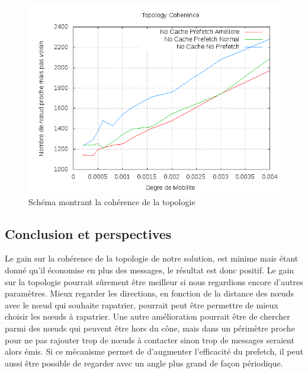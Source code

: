 	\begin{figure}[!h]
        \centering
        \includegraphics[scale=0.5]{../CacheCode/SolipsisPeersim/resultats/Courbes/Courbes_Final_Rapport/Topology_Coherence_Prefetchs.png}
	\caption{Schéma montrant la cohérence de la topologie}
	\label{courbeTopoPrefetch}
        \end{figure}



\subsection{Conclusion et perspectives}
Le gain sur la cohérence de la topologie de notre solution, est minime mais étant donné qu'il économise en plus des messages, le résultat est donc positif. Le gain sur la topologie pourrait sûrement être meilleur si nous regardions encore d'autres paramètres. Mieux regarder les directions, en fonction de la distance des nœuds avec le nœud qui souhaite rapatrier, pourrait peut être permettre de mieux choisir les nœuds à rapatrier.
Une autre amélioration pourrait être de chercher parmi des nœuds qui peuvent être hors du cône, mais dans un périmètre proche pour ne pas rajouter trop de nœuds à contacter sinon trop de messages seraient alors émis. Si ce mécanisme permet de d'augmenter l'efficacité du prefetch, il peut aussi être possible de regarder avec un angle plus grand de façon périodique.


\newpage
